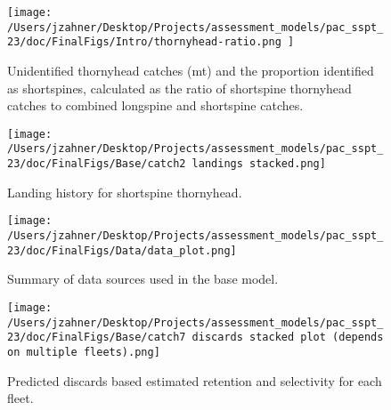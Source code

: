 \documentclass[11pt,
  letterpaper,
]{article}
\begin{document}
\begin{figure}
{\centering
\texttt{[image: /Users/jzahner/Desktop/Projects/assessment\_models/pac\_sspt\_23/doc/FinalFigs/Intro/thornyhead-ratio.png ]}
}
\caption{Unidentified thornyhead catches (mt) and the proportion identified as shortspines, calculated as the ratio of shortspine thornyhead catches to combined longspine and shortspine catches.\label{fig:thornyhead-ratio}}
\end{figure}

\begin{figure}
{\centering
\texttt{[image: /Users/jzahner/Desktop/Projects/assessment\_models/pac\_sspt\_23/doc/FinalFigs/Base/catch2 landings stacked.png]}
}
\caption{Landing history for shortspine thornyhead.\label{fig:catch_hist}}
\end{figure}

\begin{figure}
{\centering
\texttt{[image: /Users/jzahner/Desktop/Projects/assessment\_models/pac\_sspt\_23/doc/FinalFigs/Data/data\_plot.png]}
}
\caption{Summary of data sources used in the base model.\label{fig:assessment_data_timeseries}}
\end{figure}

\begin{figure}
{\centering
\texttt{[image: /Users/jzahner/Desktop/Projects/assessment\_models/pac\_sspt\_23/doc/FinalFigs/Base/catch7 discards stacked plot (depends on multiple fleets).png]}
}
\caption{Predicted discards based estimated retention and selectivity for each fleet.\label{fig:disc_hist}}
\end{figure}
\end{document}
